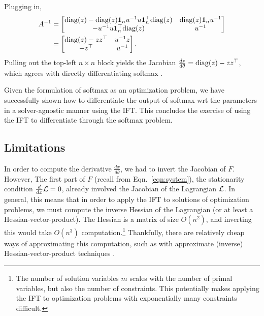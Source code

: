 \documentclass[11pt]{article}
\begin{document}
Plugging in,
\begin{equation}
\begin{aligned}
A^{-1} 
&= \begin{bmatrix}
\mathrm{diag}(z) - \mathrm{diag}(z)\mathbf{1}_nu^{-1}u\mathbf{1}^\top_n\mathrm{diag}(z)
    & \mathrm{diag}(z)\mathbf{1}_nu^{-1}\\
-u^{-1}u\mathbf{1}^\top_n \mathrm{diag}(z) & u^{-1}
\end{bmatrix}\\
&= \begin{bmatrix}
\mathrm{diag}(z) - zz^\top
    & u^{-1}z\\
    -z^\top & u^{-1}
\end{bmatrix}.
\end{aligned}
\end{equation}
Pulling out the top-left $n\times n$ block yields
the Jacobian $\frac{d z}{d\theta} = \mathrm{diag}(z) - zz^\top$,
which agrees with directly differentiating softmax \citep{sparsemax}.

Given the formulation of softmax as an optimization problem, we have
successfully shown how to differentiate
the output of softmax wrt the parameters in a solver-agnostic manner using the IFT.
This concludes the exercise of using the IFT to differentiate through the
softmax problem.


\subsection{Limitations}
\label{sec:limitations}
In order to compute the derivative $\frac{dx}{d\theta}$, we had to invert the Jacobian of $F$.
However, The first part of $F$ (recall from Eqn.~\ref{eqn:system}), the stationarity condition
$\frac{d}{dx}\mathcal{L} = 0$,
already involved the Jacobian of the Lagrangian $\mathcal{L}$.
In general, this means that in order to apply the IFT to solutions of optimization problems,
we must compute the inverse Hessian of the Lagrangian (or at least a Hessian-vector-product).
The Hessian is a matrix of size $O(n^2)$,
and inverting this would take $O(n^3)$ computation.\footnote{
The number of solution variables $m$ scales with the number of primal variables,
but also the number of constraints.
This potentially makes applying the IFT to optimization problems with exponentially
many constraints difficult.
}
Thankfully, there are relatively cheap ways of approximating this computation,
such as with approximate (inverse) Hessian-vector-product techniques
\citep{rajeswaran2019imaml,lorraine2019hoift}.
\end{document}

